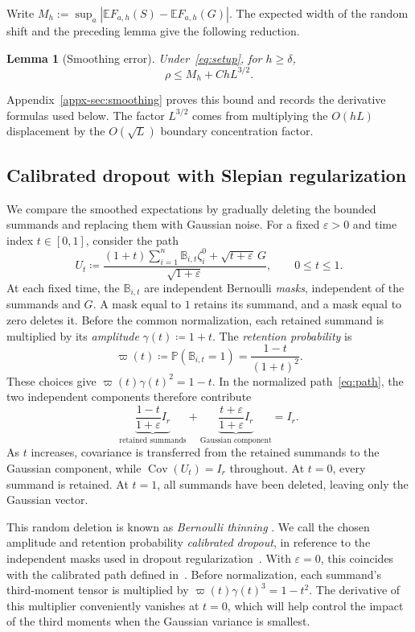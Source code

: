 \documentclass[11pt,letterpaper]{article}
\newtheorem{lemma}{Lemma}
\theoremstyle{remark}
\newcommand{\E}{\mathbb E}
\newcommand{\Pp}{\mathbb P}
\newcommand{\Cov}{\operatorname{Cov}}
\begin{document}
Write \(M_h:=\sup_a|\E F_{a,h}(S)-\E F_{a,h}(G)|\).
The expected width of the random shift and the preceding lemma give
the following reduction.
\begin{lemma}[Smoothing error]\label{lem:endpoint}
Under~\eqref{eq:setup}, for \(h\ge\delta\),
\begin{equation}
 \rho\le M_h+ChL^{3/2}.
 \label{eq:endpoint-min}
\end{equation}
\end{lemma}
Appendix~\ref{appx-sec:smoothing} proves this bound and records the
derivative formulas used below. The factor \(L^{3/2}\) comes from
multiplying the \(O(hL)\) displacement by the \(O(\sqrt L)\) boundary
concentration factor.

\subsection{Calibrated dropout with Slepian regularization}
\label{sec:outline-path}

We compare the smoothed expectations by gradually deleting the bounded
summands and replacing them with Gaussian noise. For a fixed
\(\varepsilon>0\) and time index \(t\in[0,1]\), consider the path
\begin{equation}
 U_t\coloneqq
 \frac{(1+t)\sum_{i=1}^n\mathbb B_{i,t}\zeta_i^0
             +\sqrt{t+\varepsilon}\,G}{\sqrt{1+\varepsilon}},
 \qquad 0\le t\le1.
 \label{eq:path}
\end{equation}
At each fixed time, the \(\mathbb B_{i,t}\) are independent Bernoulli
\emph{masks}, independent of the summands and \(G\). A mask equal to \(1\) retains
its summand, and a mask equal to zero deletes it. Before the common
normalization, each retained summand is multiplied by its \emph{amplitude}
\(\gamma(t)\coloneqq1+t\). The \emph{retention probability} is
\[
 \varpi(t)\coloneqq\Pp(\mathbb B_{i,t}=1)
             =\frac{1-t}{(1+t)^2}.
\]
These choices give \(\varpi(t)\gamma(t)^2=1-t\). In the normalized
path~\eqref{eq:path}, the two independent components therefore contribute
\[
 \underbrace{\frac{1-t}{1+\varepsilon}I_r}_{\text{retained summands}}
 +\underbrace{\frac{t+\varepsilon}{1+\varepsilon}I_r}_{\text{Gaussian component}}
 =I_r.
\]
As \(t\) increases, covariance is transferred from the retained summands
to the Gaussian component, while \(\Cov(U_t)=I_r\) throughout.
At \(t=0\), every summand is retained. At \(t=1\), all summands have
been deleted, leaving only the Gaussian vector.

This random deletion is known as \emph{Bernoulli thinning}
\cite{Renyi1956,SteutelHarn1979,LastPenrose2017}. We call the
chosen amplitude and retention probability \emph{calibrated dropout},
in reference to the independent masks used in dropout regularization~\cite{Dropout2014}.
With \(\varepsilon=0\), this coincides with the calibrated path
defined in~\cite[Section~4]{AL}. Before normalization, each summand's third-moment tensor is multiplied
by \(\varpi(t)\gamma(t)^3=1-t^2\). The derivative of this multiplier
conveniently vanishes at \(t=0\), which will help control the impact of
the third moments when the Gaussian variance is smallest.
\end{document}
